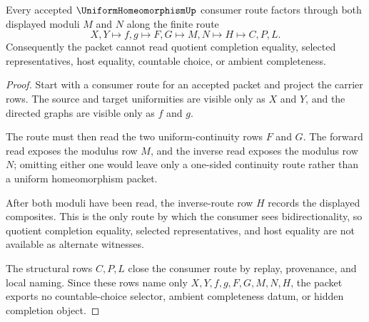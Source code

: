
\begin{theorem}
\label{thm:uniform-homeomorphism-bidirectional-modulus-route}
Every accepted $\UniformHomeomorphismUp$ consumer route factors through both displayed moduli $M$ and $N$ along the finite route
$$
X,Y\longmapsto f,g\longmapsto F,G\longmapsto M,N\longmapsto H\longmapsto C,P,L .
$$
Consequently the packet cannot read quotient completion equality, selected representatives, host equality, countable choice, or ambient completeness.
\end{theorem}
\begin{proof}
Start with a consumer route for an accepted packet and project the carrier rows. The source and target uniformities are visible only as $X$ and $Y$, and the directed graphs are visible only as $f$ and $g$.

The route must then read the two uniform-continuity rows $F$ and $G$. The forward read exposes the modulus row $M$, and the inverse read exposes the modulus row $N$; omitting either one would leave only a one-sided continuity route rather than a uniform homeomorphism packet.

After both moduli have been read, the inverse-route row $H$ records the displayed composites. This is the only route by which the consumer sees bidirectionality, so quotient completion equality, selected representatives, and host equality are not available as alternate witnesses.

The structural rows $C,P,L$ close the consumer route by replay, provenance, and local naming. Since these rows name only $X,Y,f,g,F,G,M,N,H$, the packet exports no countable-choice selector, ambient completeness datum, or hidden completion object.
\end{proof}

